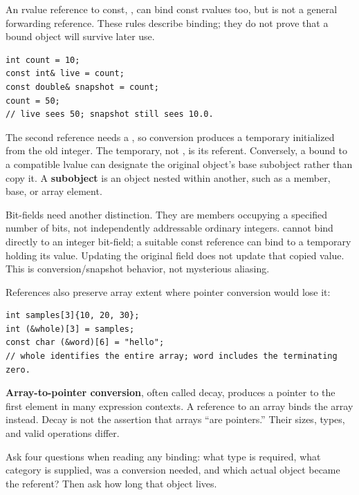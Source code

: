 An rvalue reference to const, , can bind const rvalues too, but is not a general forwarding reference. These rules describe binding; they do not prove that a bound object will survive later use.

\begin{verbatim}
int count = 10;
const int& live = count;
const double& snapshot = count;
count = 50;
// live sees 50; snapshot still sees 10.0.
\end{verbatim}

The second reference needs a , so conversion produces a temporary  initialized from the old integer. The temporary, not , is its referent. Conversely, a  bound to a compatible  lvalue can designate the original object's base subobject rather than copy it. A \textbf{subobject} is an object nested within another, such as a member, base, or array element.

Bit-fields need another distinction. They are members occupying a specified number of bits, not independently addressable ordinary integers.  cannot bind directly to an integer bit-field; a suitable const reference can bind to a temporary holding its value. Updating the original field does not update that copied value. This is conversion/snapshot behavior, not mysterious aliasing.

References also preserve array extent where pointer conversion would lose it:

\begin{verbatim}
int samples[3]{10, 20, 30};
int (&whole)[3] = samples;
const char (&word)[6] = "hello";
// whole identifies the entire array; word includes the terminating zero.
\end{verbatim}

\textbf{Array-to-pointer conversion}, often called decay, produces a pointer to the first element in many expression contexts. A reference to an array binds the array instead. Decay is not the assertion that arrays ``are pointers.'' Their sizes, types, and valid operations differ.

Ask four questions when reading any binding: what type is required, what category is supplied, was a conversion needed, and which actual object became the referent? Then ask how long that object lives.

